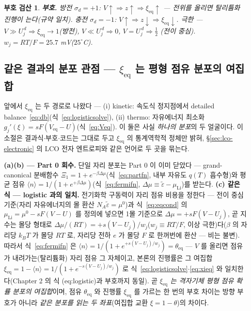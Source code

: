 \documentclass[11pt,a4paper]{article}
\newtheorem*{signbox}{부호 검산}
\newcommand{\eq}{\mathrm{eq}}
\begin{document}
\begin{signbox}
\textbf{부호.} 방전 $\sigma_d=+1$: $V\!\uparrow\Rightarrow z\!\uparrow\Rightarrow\xi_\eq\!\uparrow$ — 전위를 올리면
탈리튬화 진행이 는다(규약 일치). 충전 $\sigma_d=-1$: $V\!\uparrow\Rightarrow z\!\downarrow\Rightarrow\xi_\eq\!\downarrow$.
극한 — $V\gg U_j^{\,d}\Rightarrow\xi_\eq\to1$(방전), $V\ll U_j^{\,d}\Rightarrow0$, $V=U_j^{\,d}\Rightarrow\tfrac12$
(전이 중심). $w_j=RT/F=25.7$ mV($25^\circ$C).
\end{signbox}

\subsection{같은 결과의 분포 관점 — $\xi_\eq$ 는 평형 점유 분포의 여집합}\label{sec:dist}
앞에서 $\xi_\eq$ 는 두 경로로 나왔다 — (i) kinetic: 속도식 정지점에서 detailed balance~\eqref{eq:db}(식~\eqref{eq:logisticsolve}),
(ii) thermo: 자유에너지 최소화 $g_j'(\xi)=sF(V_\eq-U)$(식~\eqref{eq:Veq}). 이 둘은 사실 \emph{하나의 분포}의 두 얼굴이다.
이 소절은 결과식$\cdot$부호$\cdot$코드는 그대로 두고 $\xi_\eq$ 의 통계역학적 정체만 밝혀,
\S\ref{sec:lco-electronic} 의 LCO 전자 엔트로피와 같은 언어로 두 곳을 묶는다.

\textbf{(a)(b) --- Part 0 회수.} 단일 자리 분포는 Part 0 이 이미 닫았다 --- grand-canonical
분배함수 $\Xi_1=1+e^{-\beta\Delta\mu}$(식~\eqref{eq:partfn}, 내부 자유도 $q(T)$ 흡수형)와 평균 점유
$\langle n\rangle=1/(1+e^{+\beta\Delta\mu})$(식~\eqref{eq:fermifn},
$\Delta\mu\equiv\tilde\varepsilon-\mu_\mathrm{Li}$)를 받는다. \textbf{(c) 같은 식 --- logistic 과의 일치.}
전기화학 구동력이 자리 점유 비용을 정한다 --- 전이 중심 기준(자리 자유에너지의 몰 환산 $N_A\tilde\varepsilon=\mu^0$)과
식~\eqref{eq:eqcond} 의 $\mu_\mathrm{Li}=\mu^0-sF(V-U)$ 를 정의에 넣으면 1몰 기준으로
$\Delta\mu=+sF(V-U_j)$, 곧 지수는 몰당 형태로
$\Delta\mu/(RT)=+s(V-U_j)/w_j$($w_j\equiv RT/F$, 이상 극한)다($\beta$ 의 자리당 $k_BT$ 가 몰당 $RT$ 로,
자리당 전하 $e$ 가 몰당 $F$ 로 한꺼번에 환산 --- 비는 불변). 따라서 식~\eqref{eq:fermifn} 은
$\langle n\rangle=1/(1+e^{+s(V-U_j)/w_j})=\theta_\eq$ --- $V$ 를 올리면 점유가 내려가는(탈리튬화) 자리 점유
그 자체이고, 본론의 진행률은 그 여집합 $\xi_\eq=1-\langle n\rangle=1/(1+e^{-s(V-U_j)/w_j})$ 로
식~\eqref{eq:logisticsolve}$\cdot$\eqref{eq:xieq} 와 일치한다(Chapter 2 의 식 (eq:logistic)과 부호까지 동일).
곧 \emph{$\xi_\eq$ 는 격자기체 평형 점유 확률 분포의 여집합}이며, 점유 $\theta_\eq$ 와 진행률 $\xi_\eq$ 를
가르는 한 번의 부호 차이는 방향 부호가 아니라 \emph{같은 분포를 읽는 두 좌표}(여집합 교환
$\xi=1-\theta$)의 차이다.
\end{document}
